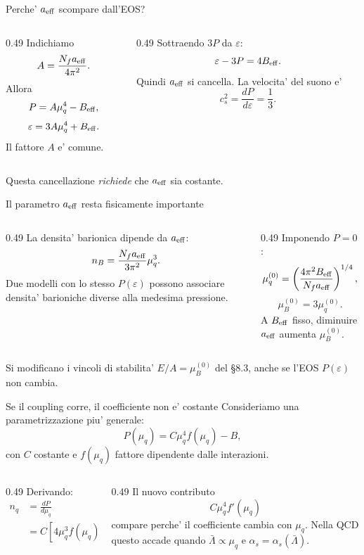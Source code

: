 \begin{frame}{Perche' $a_{\rm eff}$ scompare dall'EOS?}
\small
\begin{columns}[T,onlytextwidth]
\begin{column}{0.49\textwidth}
Indichiamo
\[
A=\frac{N_fa_{\rm eff}}{4\pi^2}.
\]
Allora
\[
P=A\mu_q^4-B_{\rm eff},
\]
\[
\varepsilon=3A\mu_q^4+B_{\rm eff}.
\]
Il fattore $A$ e' comune.
\end{column}
\begin{column}{0.49\textwidth}
Sottraendo $3P$ da $\varepsilon$:
\[
\varepsilon-3P=4B_{\rm eff}.
\]
Quindi $a_{\rm eff}$ si cancella.
\medskip
La velocita' del suono e'
\[
c_s^2=\frac{dP}{d\varepsilon}=\frac13.
\]
\end{column}
\end{columns}
\medskip
Questa cancellazione \emph{richiede} che $a_{\rm eff}$ sia costante.
\end{frame}

\begin{frame}{Il parametro $a_{\rm eff}$ resta fisicamente importante}
\small
\begin{columns}[T,onlytextwidth]
\begin{column}{0.49\textwidth}
La densita' barionica dipende da $a_{\rm eff}$:
\[
n_B=\frac{N_fa_{\rm eff}}{3\pi^2}\mu_q^3.
\]
Due modelli con lo stesso $P(\varepsilon)$
possono associare densita' barioniche
diverse alla medesima pressione.
\end{column}
\begin{column}{0.49\textwidth}
Imponendo $P=0$:
\[
\mu_q^{(0)}=
\left(\frac{4\pi^2B_{\rm eff}}
{N_fa_{\rm eff}}\right)^{1/4},
\]
\[
\mu_B^{(0)}=3\mu_q^{(0)}.
\]
A $B_{\rm eff}$ fisso, diminuire
$a_{\rm eff}$ aumenta $\mu_B^{(0)}$.
\end{column}
\end{columns}
\medskip
Si modificano i vincoli di stabilita' $E/A=\mu_B^{(0)}$
del \S8.3, anche se l'EOS $P(\varepsilon)$ non cambia.
\end{frame}

\begin{frame}{Se il coupling corre, il coefficiente non e' costante}
\small
Consideriamo una parametrizzazione piu' generale:
\[
P(\mu_q)=C\mu_q^4 f(\mu_q)-B,
\]
con $C$ costante e $f(\mu_q)$ fattore dipendente dalle interazioni.
\begin{columns}[T,onlytextwidth]
\begin{column}{0.49\textwidth}
Derivando:
\[
\begin{aligned}
n_q&=\frac{dP}{d\mu_q}\\
&=C\left[4\mu_q^3f(\mu_q)
+\mu_q^4f'(\mu_q)\right].
\end{aligned}
\]
\end{column}
\begin{column}{0.49\textwidth}
Il nuovo contributo
\[
C\mu_q^4f'(\mu_q)
\]
compare perche' il coefficiente
cambia con $\mu_q$.
\medskip
Nella QCD questo accade quando
$\bar\Lambda\propto\mu_q$ e
$\alpha_s=\alpha_s(\bar\Lambda)$.
\end{column}
\end{columns}
\end{frame}

